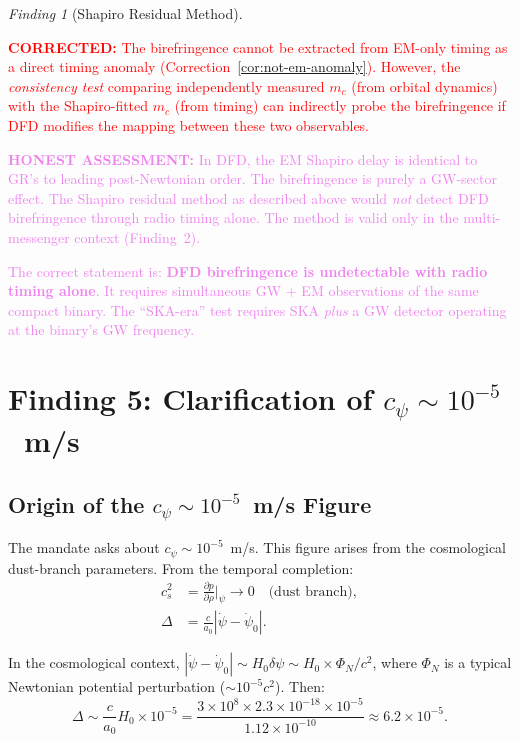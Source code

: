 \documentclass[11pt]{article}
\theoremstyle{definition}
\theoremstyle{remark}
\newtheorem{finding}[theorem]{Finding}
\newcommand{\ee}[1]{\times10^{#1}}
\newcommand{\azero}{a_0}
\newcommand{\corrected}[1]{\textcolor{red}{\textbf{CORRECTED:} #1}}
\newcommand{\honest}[1]{\textcolor{violet}{\textbf{HONEST ASSESSMENT:} #1}}
\begin{document}
\begin{finding}[Shapiro Residual Method]
\label{find:shapiro-method}

\corrected{The birefringence cannot be extracted from EM-only timing
as a direct timing anomaly (Correction~\ref{cor:not-em-anomaly}).
However, the \emph{consistency test} comparing independently
measured $m_c$ (from orbital dynamics) with the Shapiro-fitted $m_c$
(from timing) can indirectly probe the birefringence if DFD modifies
the mapping between these two observables.}

\honest{In DFD, the EM Shapiro delay is identical to GR's to
leading post-Newtonian order. The birefringence is purely a GW-sector
effect. The Shapiro residual method as described above would
\emph{not} detect DFD birefringence through radio timing alone.
The method is valid only in the multi-messenger context (Finding~2).

The correct statement is: \textbf{DFD birefringence is undetectable
with radio timing alone}. It requires simultaneous GW + EM
observations of the same compact binary. The ``SKA-era'' test
requires SKA \emph{plus} a GW detector operating at the binary's
GW frequency.}
\end{finding}


\section{Finding 5: Clarification of $c_\psi \sim 10^{-5}$~m/s}
\label{sec:cpsi}

\subsection{Origin of the $c_\psi \sim 10^{-5}$~m/s Figure}

The mandate asks about $c_\psi \sim 10^{-5}$~m/s. This figure
arises from the cosmological dust-branch parameters. From the
temporal completion:
\begin{align}
c_s^2 &= \frac{\partial p}{\partial \rho}\bigg|_{\psi} \to 0
\quad\text{(dust branch)}, \\
\Delta &= \frac{c}{\azero}|\dot\psi - \dot\psi_0|.
\end{align}

In the cosmological context, $|\dot\psi - \dot\psi_0| \sim H_0
\delta\psi \sim H_0 \times \Phi_N / c^2$, where $\Phi_N$ is a
typical Newtonian potential perturbation ($\sim 10^{-5} c^2$). Then:
\begin{equation}
\Delta \sim \frac{c}{\azero} H_0 \times 10^{-5}
= \frac{3\ee{8} \times 2.3\ee{-18} \times 10^{-5}}{1.12\ee{-10}}
\approx 6.2\ee{-5}.
\end{equation}
\end{document}

